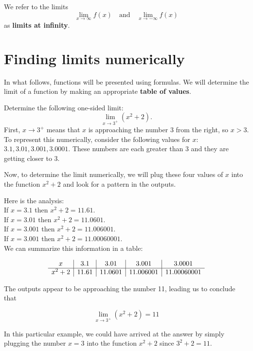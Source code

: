 \documentclass[handout]{ximera}
\begin{document}
\begin{center}
\end{center}

We refer to the limits
\[\lim_{x \to \infty} f(x)  \quad \text{and} \quad \lim_{x \to -\infty} f(x) \]
as \textbf{limits at infinity}.


\section{Finding limits numerically}



In what follows, functions will be presented using formulas.  
We will determine the limit of a function by making an appropriate \textbf{table of values}.
 

\begin{example}[example 1]
Determine the following one-sided limit: 
\[\lim_{x \to 3^{+}} (x^2 + 2).\]
First,  $x \to 3^{+}$ means that $x$ is approaching the number $3$ from the right, so $x > 3$. 
To represent this numerically, consider the following values for $x$: $3.1, 3.01, 3.001, 3.0001$.
These numbers are each greater than 3 and they are getting closer to 3.
 
Now, to determine the limit numerically,  we will plug these four values of $x$ into the function $x^2 + 2$ and  
look for a pattern in the outputs.

Here is the analysis:\\
If $x = 3.1$ then $x^2 + 2 = 11.61$.\\
If $x = 3.01$ then $x^2 + 2 = 11.0601$.\\
If $x = 3.001$ then $x^2 + 2 = 11.006001$.\\
If $x = 3.001$ then $x^2 + 2 = 11.00060001$.\\

We can summarize this information in a table:
  
\[
\begin{array}{ c | c | c | c | c }
  x & 3.1 & 3.01 & 3.001 & 3.0001 \\ 
	\hline
	x^2 + 2 & 11.61 & 11.0601 & 11.006001 & 11.00060001
\end{array}
\]


The outputs appear to be approaching the number 11, leading us to conclude that

\[\lim_{x \to 3^+} (x^2 + 2) = 11\] 
 
In this particular example, we could have arrived at the answer by simply plugging the number $x = 3$
into the function $x^2 + 2$ since $3^2 + 2 = 11$.  
\end{example}
\end{document}
